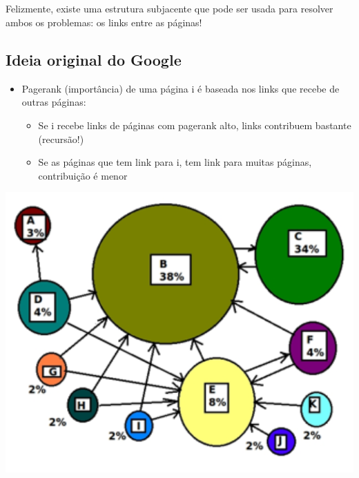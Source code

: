 \documentclass[
  letterpaper,
  DIV=11,
  numbers=noendperiod]{scrartcl}
\providecommand{\tightlist}{%
  \setlength{\itemsep}{0pt}\setlength{\parskip}{0pt}}\usepackage{longtable,booktabs,array}
\begin{document}
\hypertarget{section-1}{%
\subsection{}\label{section-1}}

\begin{tcolorbox}[enhanced jigsaw, colbacktitle=quarto-callout-tip-color!10!white, colframe=quarto-callout-tip-color-frame, opacityback=0, breakable, toprule=.15mm, leftrule=.75mm, titlerule=0mm, coltitle=black, bottomtitle=1mm, colback=white, toptitle=1mm, title=\textcolor{quarto-callout-tip-color}{\faLightbulb}\hspace{0.5em}{Tip}, arc=.35mm, rightrule=.15mm, bottomrule=.15mm, left=2mm, opacitybacktitle=0.6]
Felizmente, existe uma estrutura subjacente que pode ser usada para
resolver ambos os problemas: os links entre as páginas!
\end{tcolorbox}

\hypertarget{ideia-original-do-google}{%
\subsection{Ideia original do Google}\label{ideia-original-do-google}}

\begin{itemize}
\tightlist
\item
  Pagerank (importância) de uma página i é baseada nos links que recebe
  de outras páginas:

  \begin{itemize}
  \tightlist
  \item
    Se i recebe links de páginas com pagerank alto, links contribuem
    bastante (recursão!)
  \item
    Se as páginas que tem link para i, tem link para muitas páginas,
    contribuição é menor
  \end{itemize}
\end{itemize}

\includegraphics{figs/Aula09/ideia.png}
\end{document}
